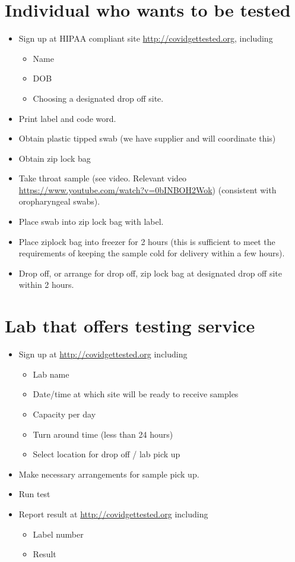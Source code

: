 \documentclass[onecolumn,journal]{IEEEtran}
\begin{document}
\section{Individual who wants to be tested}
\begin{itemize}
\item Sign up at HIPAA compliant site \url{http://covidgettested.org}, including 
	\begin{itemize}
	\item Name
	\item DOB
	\item Choosing a designated drop off site.
	\end{itemize}
\item Print label and code word.
\item Obtain plastic tipped swab (we have supplier and will coordinate this)
\item Obtain zip lock bag
\item Take throat sample (see video. Relevant video \url{https://www.youtube.com/watch?v=0bINBOH2Wok}) (consistent with oropharyngeal swabs).
\item Place swab into zip lock bag with label.
\item Place ziplock bag into freezer for 2 hours (this is sufficient to meet the requirements of keeping the sample cold for delivery within a few hours).
\item Drop off, or arrange for drop off, zip lock bag at designated drop off site within 2 hours. 
\end{itemize}

\section{Lab that offers testing service}
\begin{itemize}
\item Sign up at \url{http://covidgettested.org} including 
	\begin{itemize}
	\item Lab name
	\item Date/time at which site will be ready to receive samples
	\item Capacity per day
	\item Turn around time (less than 24 hours)
	\item Select location for drop off / lab pick up 
	\end{itemize}
\item Make necessary arrangements for sample pick up.
\item Run test
\item Report result at \url{http://covidgettested.org} including 
\begin{itemize}
	\item Label number
	\item Result
	\end{itemize}
\end{itemize}
\end{document}
